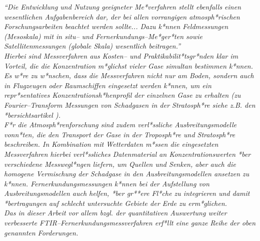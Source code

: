 \it "`Die Entwicklung und Nutzung geeigneter Me*verfahren stellt
ebenfalls einen wesentlichen Aufgabenbereich dar, der bei allen
vorrangigen atmosph*rischen Forschungsarbeiten beachtet werden
sollte... Dazu k*nnen Feldmessungen (Mesoskala) mit in situ-- und
Fernerkundungs--Me*ger*ten sowie Satellitenmessungen (globale
Skala) wesentlich beitragen."'\rm\\

Hierbei sind Messverfahren aus Kosten-- und
Praktikabilit*tsgr*nden klar im Vorteil, die die Konzentration
m*glichst vieler Gase simultan bestimmen k*nnen. Es w*re zu
w*nschen, dass die Messverfahren nicht nur am Boden, sondern auch
in Flugzeugen oder Raumschiffen eingesetzt werden k*nnen, um ein
repr*sentatives Konzentrationsh*henprofil der einzelnen Gase zu
erhalten (zu Fourier--Transform Messungen von Schadgasen in der
Stratosph*re siehe z.B. den *bersichtsartikel \cite{farmer97}).\\

F*r die Atmosph*renforschung sind zudem verl*ssliche
Ausbreitungsmodelle vonn*ten, die den Transport der Gase in der
Troposph*re und Stratosph*re beschreiben. In Kombination mit
Wetterdaten m*ssen die eingesetzten Messverfahren hierbei
verl*ssliches Datenmaterial an Konzentrationswerten *ber
verschiedene Messwegl*ngen liefern, um Quellen und Senken, aber
auch die homogene Vermischung der Schadgase in den
Ausbreitungsmodellen ansetzen zu k*nnen. Fernerkundungsmessungen
k*nnen bei der Aufstellung von Ausbreitungsmodellen auch helfen,
*ber gr**ere Fl*che zu integrieren und damit *bertragungen auf
schlecht untersuchte Gebiete der Erde zu erm*glichen.\\

Das in dieser Arbeit vor allem bzgl. der quantitativen Auswertung
weiter verbesserte FTIR--Fernerkundungsmessverfahren erf*llt eine
ganze Reihe der oben genannten Forderungen.\\


\cleardoublepage
